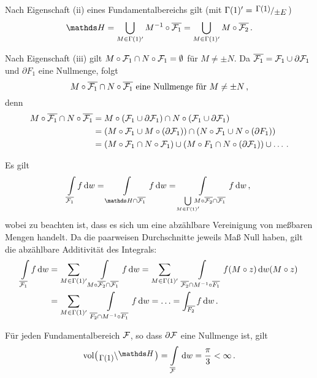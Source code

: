 \begin{bewe}
	Nach Eigenschaft (ii) eines Fundamentalbereichs gilt (mit $\Gamma(1)' = \modulo{\Gamma(1)}{\pm E}$)
	\[
	\HH = \bigcup_{M \in \Gamma(1)'} M^{-1} \circ \closure{\F_1} = \bigcup_{M \in \Gamma(1)'} M \circ \closure{\F_2}
	\,.
	\]
	
	Nach Eigenschaft (iii) gilt $M \circ \mathcal{F}_1 \cap N \circ \mathcal{F}_1 = \emptyset$ für $M \not= \pm N$.
	Da $\overline{\mathcal{F}_1} = \mathcal{F}_1 \cup \partial\mathcal{F}_1$ und $\partial F_1$ eine Nullmenge, folgt
	\[
	M \circ \overline{\mathcal{F}_1} \cap N\circ\overline{\mathcal{F}_1} \text{ eine Nullmenge für } M\not=\pm N
	\,,
	\]
	denn
	\begin{align*}
	M \circ \overline{\mathcal{F}_1} \cap N \circ \overline{\mathcal{F}_1}
	&= M \circ (\mathcal{F}_1 \cup \partial \mathcal{F}_1) \cap N \circ (\mathcal{F}_1 \cup \partial \mathcal{F}_1) \\
	&= (M \circ \mathcal{F}_1 \cup M \circ (\partial \mathcal{F}_1)) \cap (N \circ \mathcal{F}_1 \cup N \circ (\partial F_1)) \\
	&= (M \circ \mathcal{F}_1 \cap N \circ \mathcal{F}_1) \cup (M \circ F_1 \cap N \circ (\partial \mathcal{F}_1)) \cup \ldots
	\,.
	\end{align*}
	
	Es gilt
	\[
	\int\limits_{\closure{\F_1}} f \opd w
	= \int\limits_{\HH \cap \closure{\F_1}} f \opd w
	= \int\limits_{\bigcup\limits_{M \in \Gamma(1)'} \!\!\!\!\!\! M \circ \closure{\F_2} \cap \closure{\F_1}} f \opd w
	\,,
	\]
	wobei zu beachten ist, dass es sich um eine abzählbare Vereinigung von meßbaren Mengen handelt. Da die paarweisen Durchschnitte jeweils Maß Null haben, gilt die abzählbare Additivität des Integrals:
	\begin{align*}
	\int\limits_{\overline{\mathcal{F}_1}} f \,\mathrm{d} w
	&= \sum_{M \in \Gamma(1)'} \int\limits_{M\circ \overline{\mathcal{F}_2} \cap \overline{\mathcal{F}_1}} f \,\mathrm{d} w
	= \sum_{M \in \Gamma(1)'} \ \int\limits_{\overline{\mathcal{F}_2} \cap M^{-1} \circ \overline{F_1}} f(M \circ z) \,\mathrm{d} w(M \circ z) \\
	&= \sum_{M \in \Gamma(1)'}\ \int\limits_{\overline{F_2} \cap M^{-1} \circ \overline{F_1}} f \,\mathrm{d} w
	= \ldots = \int_{\overline{F_2}} f\,\mathrm{d} w
	\,.
	\end{align*}
\end{bewe}

\begin{bsp}
	Für jeden Fundamentalbereich $\mathcal{F}$, so dass $\partial \mathcal{F}$ eine Nullmenge ist, gilt
	\[
	\vol\bigl(\linksmodulo{\Gamma(1)}\HH\bigr) = \int\limits_{\closure \F} \opd w = \frac{\pi}{3} < \infty
	\,.
	\]
\end{bsp}

